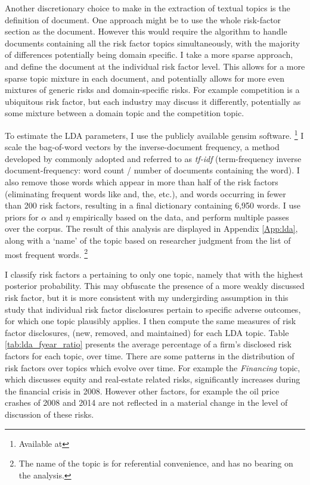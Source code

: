 Another discretionary choice to make in the extraction of textual topics is the definition of document.
One approach might be to use the whole risk-factor section as the document.
However this would require the algorithm to handle documents containing all the risk factor topics simultaneously, with the majority of differences potentially being domain specific.
I take a more sparse approach, and define the document at the individual risk factor level.
This allows for a more sparse topic mixture in each document, and potentially allows for more even mixtures of generic risks and domain-specific risks.
For example competition is a ubiquitous risk factor, but each industry may discuss it differently, potentially as some mixture between a domain topic and the competition topic.


To estimate the LDA parameters, I use the publicly available gensim software.%
\footnote{Available at }
I scale the bag-of-word vectors by the inverse-document frequency, a method developed by \cite{salton_1986} commonly adopted and referred to as \textit{tf-idf} (term-frequency inverse document-frequency: word count / number of documents containing the word).
I also remove those words which appear in more than half of the risk factors (eliminating frequent words like and, the, etc.), and words occurring in fewer than 200 risk factors, resulting in a final dictionary containing 6,950 words.
I use priors for $\alpha$ and $\eta$ empirically based on the data, and perform multiple passes over the corpus.
The result of this analysis are displayed in Appendix \ref{App:lda}, along with a `name' of the topic based on researcher judgment from the list of most frequent words.%
    \footnote{The name of the topic is for referential convenience, and has no bearing on the analysis.}


I classify risk factors a pertaining to only one topic, namely that with the highest posterior probability.
This may obfuscate the presence of a more weakly discussed risk factor, but it is more consistent with my undergirding assumption in this study that individual risk factor disclosures pertain to specific adverse outcomes, for which one topic plausibly applies.
I then compute the same measures of risk factor disclosures, (new, removed, and maintained) for each LDA topic.
Table \ref{tab:lda_fyear_ratio} presents the average percentage of a firm's disclosed risk factors for each topic, over time.
There are some patterns in the distribution of risk factors over topics which evolve over time.
For example the \textit{Financing} topic, which discusses equity and real-estate related risks, significantly increases during the financial crisis in 2008.
However other factors, for example the oil price crashes of 2008 and 2014 are not reflected in a material change in the level of discussion of these risks.



